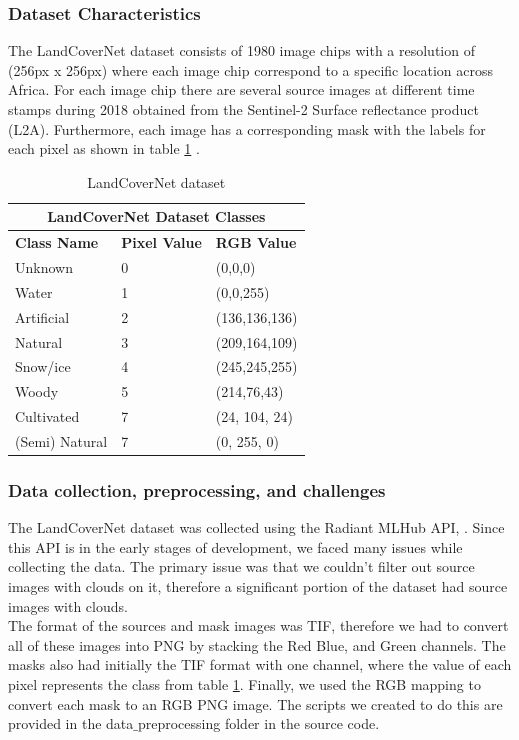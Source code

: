 \documentclass[conference]{IEEEtran}
\begin{document}
\subsubsection{Dataset Characteristics}
The LandCoverNet dataset consists of 1980 image chips with a resolution of (256px x 256px) where each image chip correspond to a specific location across Africa. For each image chip there are several source images at different time stamps during 2018  obtained from the Sentinel-2 Surface reflectance product (L2A). Furthermore, each image has a corresponding mask with the labels for each pixel as shown in table \ref{landcovernet_dataset} \cite{DBLP:journals/corr/abs-2012-03111}. 





\begin{table}[htbp]
\centering
\caption{LandCoverNet dataset}
\begin{tabular}{|p{1.8cm}|p{0.6cm}|p{1.6cm}|}
 \hline
 \multicolumn{3}{|c|}{\textbf{LandCoverNet Dataset Classes}} \\
 \hline
 \textbf{Class Name} & \textbf{Pixel Value}& \textbf{RGB Value} \\
 \hline
 Unknown & 0  & (0,0,0)\\ 
 \hline
 Water & 1  & (0,0,255)\\ 
 \hline
 Artificial & 2  & (136,136,136)\\ 
 \hline
 Natural & 3  & (209,164,109)\\ 
 \hline
 Snow/ice & 4 &  (245,245,255)\\ 
 \hline
 Woody & 5  & (214,76,43)\\ 
 \hline
 Cultivated & 7  & (24, 104, 24)\\ 
 \hline
 (Semi) Natural & 7  & (0, 255, 0)\\ 
 \hline
\end{tabular}
\label{landcovernet_dataset}
\end{table}

\subsubsection{Data collection, preprocessing, and challenges}

The LandCoverNet dataset \cite{DBLP:journals/corr/abs-2012-03111} was collected using the Radiant MLHub API, \cite{radiant_mlhub_api}. Since this API is in the early stages of development, we faced many issues while collecting the data. The primary issue was that we couldn't filter out source images with clouds on it, therefore a significant portion of the dataset had source images with clouds. \\ \indent
The format of the sources and mask images was TIF, therefore we had to convert all of these images into PNG by stacking the Red Blue, and Green channels. The masks also had initially the TIF format with one channel, where the value of each pixel represents the class from table \ref{landcovernet_dataset}. Finally, we used the RGB mapping to convert each mask to an RGB PNG image. The scripts we created to do this are provided in the data$\_$preprocessing folder in the source code.
\end{document}
